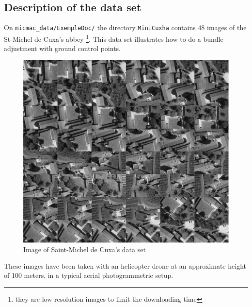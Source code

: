 
\subsection{Description of the data set}
\label{Cuxa:DataSet}

On {\tt micmac\_data/ExempleDoc/} the directory {\tt MiniCuxha} contains
$48$ images of the St-Michel de Cuxa's abbey \footnote{they are low resolution images
to limit the  downloading time}. This data set illustrates how to
do a bundle adjustment with ground control points.

\begin{figure}[H]
\begin{center}
\includegraphics[width=160mm]{FIGS/Cuxa/Planche.jpg}
\caption{Image of Saint-Michel de Cuxa's data set }
\end{center}
\label{FIG:Glob:Cuxa}
\end{figure}

These images have been taken with an helicopter drone at an approximate height of 100 meters, in a typical aerial photogrammetric setup.

